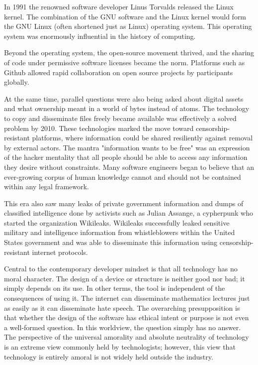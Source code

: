 In 1991 the renowned software developer Linus Torvalds released the Linux
kernel. The combination of the GNU software and the Linux kernel would form the
GNU Linux (often shortened just as Linux) operating system. This operating
system was enormously influential in the history of computing.

Beyond the operating system, the open-source movement thrived, and the sharing
of code under permissive software licenses became the norm. Platforms such as
Github allowed rapid collaboration on open source projects by participants
globally.

At the same time, parallel questions were also being asked about digital assets
and what ownership meant in a world of bytes instead of atoms. The technology to
copy and disseminate files freely became available was effectively a solved
problem by 2010. These technologies marked the move toward censorship-resistant
platforms, where information could be shared resiliently against removal by
external actors. The mantra "information wants to be free" was an expression of
the hacker mentality that all people should be able to access any information
they desire without constraints. Many software engineers began to believe that
an ever-growing corpus of human knowledge cannot and should not be contained
within any legal framework.

This era also saw many leaks of private government information and dumps of
classified intelligence done by activists such as Julian Assange, a cypherpunk
who started the organization Wikileaks. Wikileaks successfully leaked sensitive
military and intelligence information from whistleblowers within the United
States government and was able to disseminate this information using
censorship-resistant internet protocols.


Central to the contemporary developer mindset is that all technology has no
moral character. The design of a device or structure is neither good nor bad; it
simply depends on its use. In other terms, the tool is independent of the
consequences of using it. The internet can disseminate mathematics lectures just
as easily as it can disseminate hate speech. The overarching presupposition is
that whether the design of the software has ethical intent or purpose is not
even a well-formed question. In this worldview, the question simply has no
answer. The perspective of the universal amorality and absolute neutrality of
technology is an extreme view commonly held by technologists; however, this view
that technology is entirely amoral is not widely held outside the industry.

